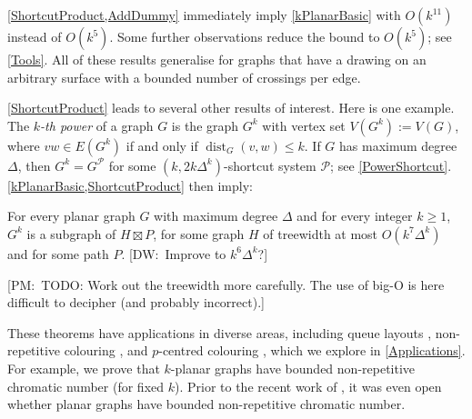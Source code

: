 \documentclass{patmorin}
\newcommand{\note}[2]{{\color{red}[#1:~#2]}}
\DeclareMathOperator{\dist}{dist}
\newcommand{\PP}{\mathcal{P}}
\renewcommand{\geq}{\geqslant}
\renewcommand{\leq}{\leqslant}
\begin{document}
\cref{ShortcutProduct,AddDummy} immediately imply \cref{kPlanarBasic} with $O(k^{11})$ instead of $O(k^5)$. Some further observations reduce the bound to $O(k^5)$; see \cref{Tools}. All of these results  generalise for graphs that have a drawing on an arbitrary surface with a bounded number of crossings per edge. 

\cref{ShortcutProduct} leads to several other results of interest. Here is one example. The \emph{$k$-th power} of a graph $G$ is the graph $G^k$ with vertex set $V(G^k):=V(G)$, where $vw\in E(G^k)$ if and only if $\dist_G(v,w)\leq k$. If $G$ has maximum degree $\Delta$, then $G^k = G^\PP$ for some $(k,2k\Delta^{k})$-shortcut system $\PP$; see \cref{PowerShortcut}. \cref{kPlanarBasic,ShortcutProduct} then imply:


\begin{thm}
\label{kPowerBasic}
For every planar graph $G$ with maximum degree $\Delta$ and for every integer $k\geq 1$, $G^k$ is a subgraph of $H\boxtimes P$, for some graph $H$ of treewidth at most $O( k^7 \Delta^{k})$ and for some path $P$. \note{DW}{Improve to $k^6\Delta^{k}$?}
\end{thm}
\note{PM}{TODO: Work out the treewidth more carefully. The use of big-O is here difficult to decipher (and probably incorrect).}


These theorems have applications in diverse areas, including queue layouts  \citep{dujmovic.joret.ea:planar}, non-repetitive colouring  \citep{dujmovic.esperet.ea:planar}, and $p$-centred colouring  \citep{micek:personal}, 
which we explore in \cref{Applications}. For example, we prove that $k$-planar graphs have bounded non-repetitive chromatic number (for fixed $k$). Prior to the recent work of \citet{dujmovic.esperet.ea:planar}, it was even open whether planar graphs have bounded non-repetitive chromatic number.

\end{document}
